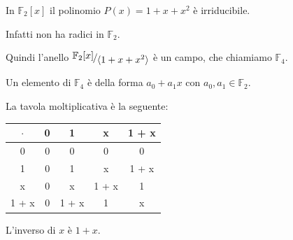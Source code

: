 \documentclass[../main.tex]{subfiles}
\begin{document}
\begin{example}
    In $\mathbb{F}_2[x]$ il polinomio $P(x) = 1 + x + x^2$ è irriducibile.

    Infatti non ha radici in $\mathbb{F}_2$.

    Quindi l'anello $\nicefrac{\mathbb{F}_2[x]}{\langle1 + x + x^2\rangle}$ è un campo, che chiamiamo $\mathbb{F}_4$.

    Un elemento di $\mathbb{F}_4$ è della forma $a_0 + a_1x$ con $a_0,a_1 \in \mathbb{F}_2$.

    La tavola moltiplicativa è la seguente:
    \begin{center}
        \begin{tabular}{c|c|c|c|c}
            $\cdot$ & 0 & 1     & x     & 1 + x \\
            \hline
            0       & 0 & 0     & 0     & 0     \\
            \hline
            1       & 0 & 1     & x     & 1 + x \\
            \hline
            x       & 0 & x     & 1 + x & 1     \\
            \hline
            1 + x   & 0 & 1 + x & 1     & x     \\
        \end{tabular}
    \end{center}
    L'inverso di $x$ è $1 + x$.
\end{example}
\end{document}
